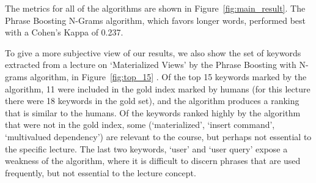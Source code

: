 The metrics for all of the algorithms are shown in
Figure~\ref{fig:main_result}. The Phrase Boosting N-Grams algorithm,
which favors longer words, performed best with a Cohen's Kappa of
0.237.



To give a more subjective view of our results, we also show the set of keywords extracted from a lecture on `Materialized Views' by the Phrase Boosting with N-grams algorithm, in Figure~\ref{fig:top_15} . Of the top 15 keywords marked by the algorithm, 11 were included in the gold index marked by humans (for this lecture there were 18 keywords in the gold set), and the algorithm produces a ranking that is similar to the humans. Of the keywords ranked highly by the algorithm that were not in the gold index, some (`materialized', `insert command', `multivalued dependency') are relevant to the course, but perhaps not essential to the specific lecture. The last two keywords, `user' and `user query' expose a weakness of the algorithm, where it is difficult to discern phrases that are used frequently, but not essential to the lecture concept.
